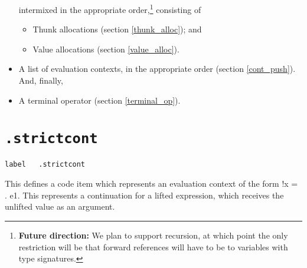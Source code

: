 \documentclass{report}
\newcommand\stringcode[1]{\texttt{#1}}
\newcommand\future[1]{\footnote{\textbf{Future direction:} #1}}
\begin{document}
\begin{itemize}
        intermixed in the appropriate order,\future{We plan to support recursion, at which point the only restriction will be that forward references will have to be to variables with type signatures.}
        consisting of
        \begin{itemize}
            \item Thunk allocations (section \ref{thunk_alloc}); and
            \item Value allocations (section \ref{value_alloc}).
        \end{itemize}
    \item A list of evaluation contexts, in the appropriate order (section \ref{cont_push}).
        And, finally,
    \item A terminal operator (section \ref{terminal_op}).
\end{itemize}

\section{\stringcode{.strictcont}}

\begin{verbatim}
label	.strictcont
\end{verbatim}

This defines a code item which represents an evaluation context of the form \< !x = \bullet. e1\>.
This represents a continuation for a lifted expression, which receives the unlifted value as an argument.
\end{document}
